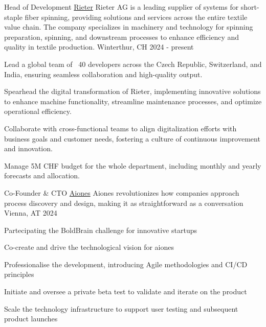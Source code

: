 
\begin{cventries}
  \cventry
    {Head of Development} %
    {\href{https://www.rieter.com}{Rieter}} %
    {Rieter AG is a leading supplier of systems for short-staple fiber spinning, providing solutions and services across the entire textile value chain. The company specializes in machinery and technology for spinning preparation, spinning, and downstream processes to enhance efficiency and quality in textile production.} %
    {Winterthur, CH} %
    {2024 - present} %
    {
        \begin{cvitems}
            \item {Lead a global team of ~40 developers across the Czech Republic, Switzerland, and India, ensuring seamless collaboration and high-quality output.}
            \item {Spearhead the digital transformation of Rieter, implementing innovative solutions to enhance machine functionality, streamline maintenance processes, and optimize operational efficiency.}
            \item {Collaborate with cross-functional teams to align digitalization efforts with business goals and customer needs, fostering a culture of continuous improvement and innovation.}
            \item {Manage 5M CHF budget for the whole department, including monthly and yearly forecasts and allocation.}
        \end{cvitems}
    }
  \cventry
  {Co-Founder \& CTO} %
  {\href{https://www.aiones.ai}{Aiones}} %
  {Aiones revolutionizes how companies approach process discovery and design, making it as straightforward as a conversation} %
  {Vienna, AT} %
  {2024} %
  {
    \begin{cvitems} %
      \item {Partecipating the BoldBrain challenge for innovative startups}
      \item {Co-create and drive the technological vision for aiones}
      \item {Professionalise the development, introducing Agile methodologies and CI/CD principles}
      \item {Initiate and oversee a private beta test to validate and iterate on the product}
      \item {Scale the technology infrastructure to support user testing and subsequent product launches}

\end{cvitems}}
\end{cventries}
